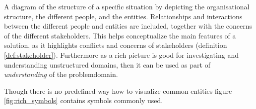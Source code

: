 \begin{method} \label{meth:rich_picture} 
  A diagram of the structure of a specific situation by depicting the organisational structure, the different people, and the entities. Relationships and interactions between the different people and entities are included, together with the concerns of the different stakeholders. This helps conceptualize the main features of a solution, as it highlights conflicts and concerns of stakeholders (definition \ref{def:stakeholder}). Furthermore as a rich picture is good for investigating and understanding unstructured domains, then it can be used as part of \emph{understanding} of the problemdomain. \cite[p. 51]{benyon_14}

  Though there is no predefined way how to visualize common entities figure \ref{fig:rich_symbols} contains symbols commonly used.
  
\end{method}
